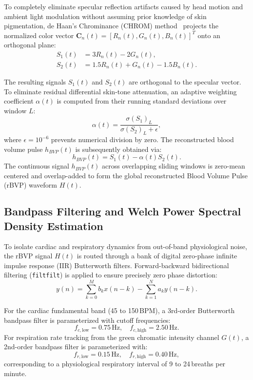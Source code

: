 \documentclass[journal]{IEEEtran}
\begin{document}
To completely eliminate specular reflection artifacts caused by head motion and ambient light modulation without assuming prior knowledge of skin pigmentation, de Haan's Chrominance (CHROM) method~\cite{ref16} projects the normalized color vector $\mathbf{C}_n(t) = [R_n(t), G_n(t), B_n(t)]^T$ onto an orthogonal plane:
\begin{align}
    S_1(t) &= 3 R_n(t) - 2 G_n(t), \label{eq:s1} \\
    S_2(t) &= 1.5 R_n(t) + G_n(t) - 1.5 B_n(t). \label{eq:s2}
\end{align}

The resulting signals $S_1(t)$ and $S_2(t)$ are orthogonal to the specular vector. To eliminate residual differential skin-tone attenuation, an adaptive weighting coefficient $\alpha(t)$ is computed from their running standard deviations over window $L$:
\begin{equation}
    \alpha(t) = \frac{\sigma(S_1)_L}{\sigma(S_2)_L + \epsilon},
    \label{eq:alpha}
\end{equation}
where $\epsilon = 10^{-6}$ prevents numerical division by zero. The reconstructed blood volume pulse $h_{BVP}(t)$ is subsequently obtained via:
\begin{equation}
    h_{BVP}(t) = S_1(t) - \alpha(t) S_2(t).
    \label{eq:bvp_raw}
\end{equation}
The continuous signal $h_{BVP}(t)$ across overlapping sliding windows is zero-mean centered and overlap-added to form the global reconstructed Blood Volume Pulse (rBVP) waveform $H(t)$.

\subsection{Bandpass Filtering and Welch Power Spectral Density Estimation}

To isolate cardiac and respiratory dynamics from out-of-band physiological noise, the rBVP signal $H(t)$ is routed through a bank of digital zero-phase infinite impulse response (IIR) Butterworth filters. Forward-backward bidirectional filtering (\texttt{filtfilt}) is applied to ensure precisely zero phase distortion:
\begin{equation}
    y(n) = \sum_{k=0}^{M} b_k x(n-k) - \sum_{k=1}^{N} a_k y(n-k).
    \label{eq:butterworth}
\end{equation}

For the cardiac fundamental band (45 to 150\,BPM), a 3rd-order Butterworth bandpass filter is parameterized with cutoff frequencies:
\begin{equation}
    f_{c,\text{low}} = 0.75\,\text{Hz}, \quad f_{c,\text{high}} = 2.50\,\text{Hz}.
\end{equation}
For respiration rate tracking from the green chromatic intensity channel $G(t)$, a 2nd-order bandpass filter is parameterized with:
\begin{equation}
    f_{r,\text{low}} = 0.15\,\text{Hz}, \quad f_{r,\text{high}} = 0.40\,\text{Hz},
\end{equation}
corresponding to a physiological respiratory interval of 9 to 24\,breaths per minute.
\end{document}
